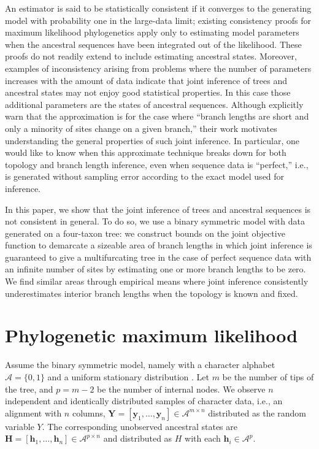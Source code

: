 \documentclass[11pt]{article}
\newcommand{\alphabet}{\mathcal{A}}
\newcommand{\fullAlignment}{\mathbf{Y}}
\newcommand{\alignmentColumn}{\mathbf{y}}
\newcommand{\alignmentColumnRV}{Y}
\newcommand{\fullAncestralStates}{\mathbf{H}}
\newcommand{\ancestralStateColumn}{\mathbf{h}}
\newcommand{\ancestralStateColumnRV}{H}
\newcommand{\nCols}{n}
\newcommand{\nSiteRows}{m}
\newcommand{\nAncestralStateRows}{p}
\begin{document}
An estimator is said to be statistically consistent if it converges to the generating model with probability one in the large-data limit; existing consistency proofs for maximum likelihood phylogenetics \citep{Allman2008-wd,Chai2011-ff,RoyChoudhury2015-ta} apply only to estimating model parameters when the ancestral sequences have been integrated out of the likelihood.
These proofs do not readily extend to include estimating ancestral states.
Moreover, examples of inconsistency arising from problems where the number of parameters increases with the amount of data \citep{Neyman1948-tt} indicate that joint inference of trees and ancestral states may not enjoy good statistical properties.
In this case those additional parameters are the states of ancestral sequences.
Although \citet{Sagulenko2018-xl} explicitly warn that the approximation is for the case where ``branch lengths are short and only a minority of sites change on a given branch,'' their work motivates understanding the general properties of such joint inference.
In particular, one would like to know when this approximate technique breaks down for both topology and branch length inference, even when sequence data is ``perfect,'' i.e., is generated without sampling error according to the exact model used for inference.

In this paper, we show that the joint inference of trees and ancestral sequences is not consistent in general.
To do so, we use a binary symmetric model with data generated on a four-taxon tree: we construct bounds on the joint objective function to demarcate a sizeable area of branch lengths in which joint inference is guaranteed to give a multifurcating tree in the case of perfect sequence data with an infinite number of sites by estimating one or more branch lengths to be zero.
We find similar areas through empirical means where joint inference consistently underestimates interior branch lengths when the topology is known and fixed.

\section*{Phylogenetic maximum likelihood}

Assume the binary symmetric model, namely with a character alphabet $\alphabet=\{0,1\}$ and a uniform stationary distribution \citep{Semple2003-em}.
Let $\nSiteRows$ be the number of tips of the tree, and $\nAncestralStateRows = \nSiteRows-2$ be the number of internal nodes.
We observe $\nCols$ independent and identically distributed samples of character data, i.e., an alignment with $\nCols$ columns, $\fullAlignment=[\alignmentColumn_1,\ldots,\alignmentColumn_\nCols]\in\alphabet^{\nSiteRows\times\nCols}$ distributed as the random variable $\alignmentColumnRV$.
The corresponding unobserved ancestral states are $\fullAncestralStates=[\ancestralStateColumn_1,\ldots,\ancestralStateColumn_\nCols]\in\alphabet^{\nAncestralStateRows\times\nCols}$ and distributed as $\ancestralStateColumnRV$ with each $\ancestralStateColumn_i\in\alphabet^\nAncestralStateRows$.
\end{document}

